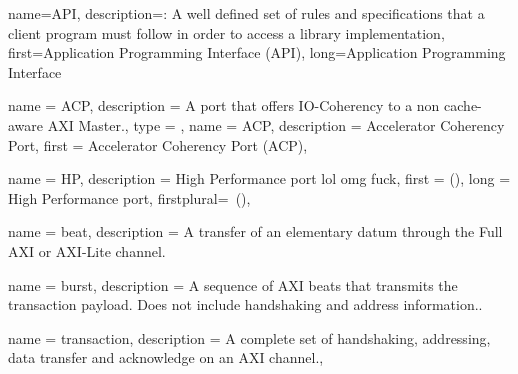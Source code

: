 
{
    name={API},
    description={: A well defined set of rules and specifications
    	that a client program must follow in order to access a library implementation},
    first={Application Programming Interface (API)},
    long={Application Programming Interface}
}


{
	name = {ACP},
	description = {A port that offers IO-Coherency to a non cache-aware AXI Master.},
}
{
	type = \acronymtype,
	name = {ACP},
	description = {Accelerator Coherency Port},
	first = {Accelerator Coherency Port (ACP)},
}

{
	name = {HP},
	description = {High Performance port lol omg fuck},
	first = { ()},
	long = {High Performance port},
	firstplural={\glspluralsuffix\ (\glspluralsuffix)},
}

{
	name = {beat},
	description = {A transfer of an elementary datum through the Full AXI or AXI-Lite channel.}
}

{
	name = {burst},
	description = {A sequence of AXI \Glspl{beat} that transmits the \gls{transaction} payload.
	Does not include handshaking and address information.}.
}

{
	name = {transaction},
	description = {A complete set of handshaking, addressing, data transfer and acknowledge on
	an AXI channel.},
}


